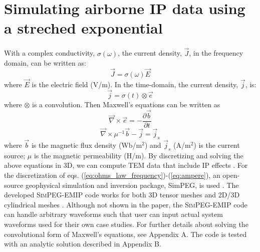 \documentclass[manuscript]{geophysics}
\newcommand{\curl}{{\vec \nabla}\times}
\newcommand {\J}{{\vec J}}
\newcommand {\E}{{\vec E}}
\renewcommand {\j}  { {\vec j} }
\renewcommand {\b}  { {\vec b} }
\newcommand {\e}  { {\vec e} }
\begin{document}
\section{Simulating airborne IP data using a streched exponential}
With a complex conductivity, $\sigma(\omega)$, the current density, $\J$, in the frequency domain, can be written as:
\begin{equation}
    \J = \sigma(\omega)\E
    \label{eq:ohms_law_frequency}
\end{equation}
where $\E$ is the electric field (V/m). In the time-domain, the current density, $\j$, is:
\begin{equation}
    \j = \sigma(t) \otimes \e
    \label{eq:ohms_law_time}
\end{equation}
where $\otimes$ is a convolution. Then Maxwell's equations can be written as
\begin{equation}
    \curl \e = -\frac{\partial \b}{\partial t}
    \label{eq:faraday}
\end{equation}
\begin{equation}
    \curl \mu^{-1}\b - \j = \j_s
    \label{eq:ampere}
\end{equation}
where $\b$ is the magnetic flux density (Wb/m$^2$) and $\j_s$ (A/m$^2$) is the current source;  $\mu$ is the magnetic permeability (H/m). By discretizing and solving the above equations in 3D, we can compute TEM data that include IP effects \cite[]{marchant2014,marchant2015}. For the discretization of eqs. (\ref{eq:ohms_law_frequency})-(\ref{eq:ampere}), an open-source geophysical simulation and inversion package, SimPEG, is used \cite[]{cockett2015}. The developed \textsc{SimPEG-EMIP} code works for both 3D tensor meshes and 2D/3D cylindrical meshes \cite[]{heagy2017}. Although not shown in the paper, the  \textsc{SimPEG-EMIP} code can handle arbitrary waveforms such that user can input actual system waveforms used for their own case studies. For further details about solving the convolutional form of Maxwell's equations, see Appendix A. The code is tested with an analytic solution described in Appendix B.
\end{document}
